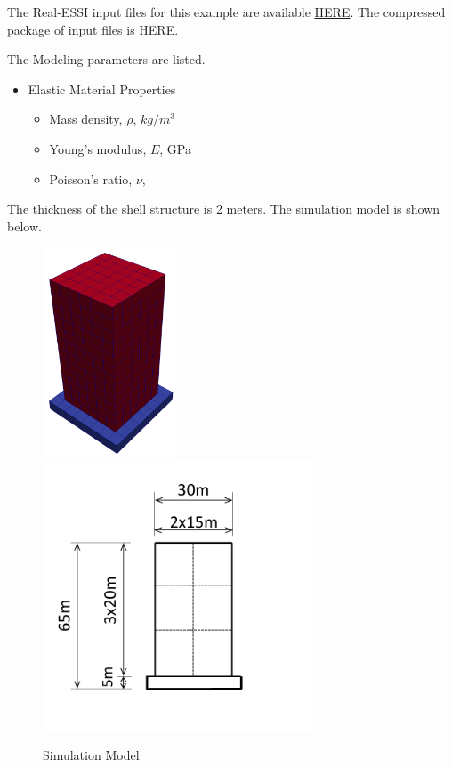 The Real-ESSI input files for this example are available 
\href{https://github.com/yuan-energy/Real-ESSI-Short-Course-Examples/tree/master/short-course-examples/nonlinear_analysis_steps/structure/imposed_motion}{HERE}. 
The compressed package of input files is  
\href{https://github.com/yuan-energy/Real-ESSI-Short-Course-Examples/tree/master/short-course-examples/nonlinear_analysis_steps/structure/imposed_motion/imposed_motion.tgz?raw=true}{HERE}. 

The Modeling parameters are listed.
\begin{itemize}
  \item Elastic Material Properties 
  \begin{itemize}
    \item Mass density, $\rho$, \enspace {} $kg/m^3$
    \item Young's modulus, $E$, \enspace {} GPa
    \item Poisson's ratio, $\nu$, \enspace {}
  \end{itemize}
\end{itemize}


The thickness of the shell structure is 2 meters.
The simulation model is shown below.
\begin{figure}[H]
  \centering
  \includegraphics[width = 4cm]{./Figure-files/nonlinear_analysis_steps/structure/imposed_motion/structure-only.png}
  \hspace{2cm}
  \includegraphics[width = 8cm]{./Figure-files/nonlinear_analysis_steps/structure/eigen/structure_geometry.pdf}
  \caption{Simulation Model}
  \label{fig_simulate_model}
\end{figure}



